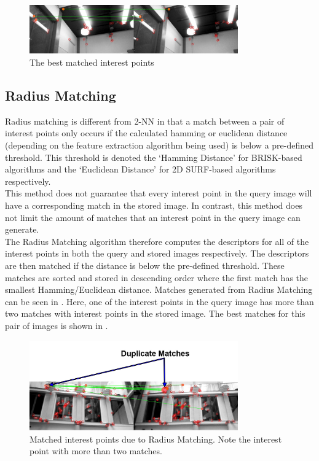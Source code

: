 \documentclass[11pt]{report}
\begin{document}
 \begin{figure}[h!] 
  \centering
    \includegraphics[width=0.8\textwidth]{../Drawings/Matching/feature_matching/dataset1_without_validation_knn_best.jpg}
    \caption{The best matched interest points}
    \label{fig:2nn_best_match}
\end{figure}

\subsection{Radius Matching}
\label{sec:radius}
Radius matching is different from 2-NN in that a match between a pair of interest points only occurs if the calculated hamming or euclidean distance (depending on the feature extraction algorithm being used) is below a pre-defined threshold. This threshold is denoted the `Hamming Distance' for BRISK-based algorithms and the `Euclidean Distance' for 2D SURF-based algorithms respectively. \\

This method does not guarantee that every interest point in the query image will have a corresponding match in the stored image. In contrast, this method does not limit the amount of matches that an interest point in the query image can generate.\\

The Radius Matching algorithm therefore computes the descriptors for all of the interest points in both the query and stored images respectively. The descriptors are then matched if the distance is below the pre-defined threshold. These matches are sorted and stored in descending order where the first match has the smallest Hamming/Euclidean distance. Matches generated from Radius Matching can be seen in . Here, one of the interest points in the query image has more than two matches with interest points in the stored image. The best matches for this pair of images is shown in .\\ 


 \begin{figure}[h!] 
  \centering
    \includegraphics[width=0.8\textwidth]{../Drawings/Matching/feature_matching/dataset1_without_validation_radius_photo.jpg}
    \caption{Matched interest points due to Radius Matching. Note the interest point with more than two matches.}
    \label{fig:radius_match}
\end{figure}
\end{document}

